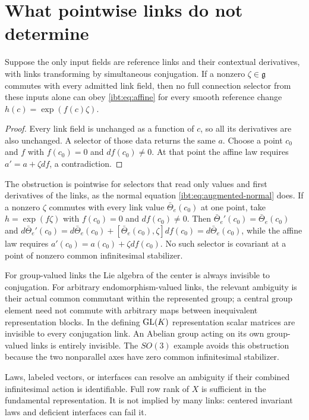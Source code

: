 \section{What pointwise links do not determine}

Suppose the only input fields are reference links and their contextual derivatives, with links transforming by simultaneous conjugation. If a nonzero $\zeta\in\mathfrak g$ commutes with every admitted link field, then no full connection selector from these inputs alone can obey \cref{ibt:eq:affine} for every smooth reference change $h(c)=\exp(f(c)\zeta)$.
\begin{proof}
Every link field is unchanged as a function of $c$, so all its derivatives are also unchanged. A selector of those data returns the same $a$. Choose a point $c_0$ and $f$ with $f(c_0)=0$ and $d f(c_0)\ne0$. At that point the affine law requires $a'=a+\zeta d f$, a contradiction.
\end{proof}

The obstruction is pointwise for selectors that read only values and first derivatives of the links, as the normal equation \cref{ibt:eq:augmented-normal} does. If a nonzero $\zeta$ commutes with every link value $\bar\Theta_e(c_0)$ at one point, take $h=\exp(f\zeta)$ with $f(c_0)=0$ and $df(c_0)\neq0$. Then $\bar\Theta_e'(c_0)=\bar\Theta_e(c_0)$ and $d\bar\Theta_e'(c_0)=d\bar\Theta_e(c_0)+[\bar\Theta_e(c_0),\zeta]df(c_0)=d\bar\Theta_e(c_0)$, while the affine law requires $a'(c_0)=a(c_0)+\zeta df(c_0)$. No such selector is covariant at a point of nonzero common infinitesimal stabilizer.

For group-valued links the Lie algebra of the center is always invisible to conjugation. For arbitrary endomorphism-valued links, the relevant ambiguity is their actual common commutant within the represented group; a central group element need not commute with arbitrary maps between inequivalent representation blocks. In the defining $\mathrm{GL}(K)$ representation scalar matrices are invisible to every conjugation link. An Abelian group acting on its own group-valued links is entirely invisible. The $SO(3)$ example avoids this obstruction because the two nonparallel axes have zero common infinitesimal stabilizer.

Laws, labeled vectors, or interfaces can resolve an ambiguity if their combined infinitesimal action is identifiable. Full row rank of $X$ is sufficient in the fundamental representation. It is not implied by many links: centered invariant laws and deficient interfaces can fail it.

